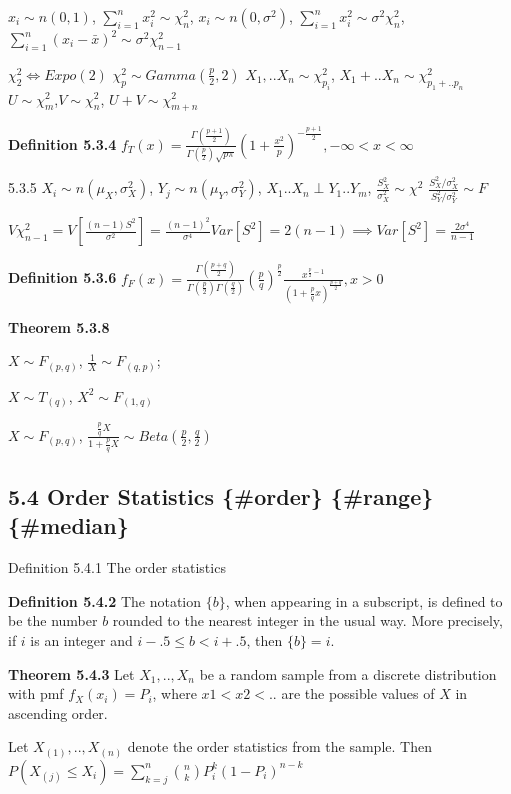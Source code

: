 \documentclass[10pt,twocolumn,portrait]{article}
\begin{document}
\(x_i\sim n(0,1)\), \(\sum_{i=1}^nx_i^2\sim \chi^2_n\),
\(x_i\sim n(0,\sigma^2)\), \(\sum_{i=1}^nx_i^2\sim \sigma^2\chi^2_n\),
\(\sum_{i=1}^n(x_i-\bar x)^2\sim \sigma^2\chi^2_{n-1}\)

\(\chi^2_{2}\Leftrightarrow Expo(2)\)
\(\chi^2_{p}\sim Gamma(\frac{p}2,2)\) \(X_1,..X_n\sim \chi^2_{p_i}\),
\(X_1+..X_n\sim \chi^2_{p_1+..p_n}\)
\(U\sim \chi^2_{m}\),\(V\sim \chi^2_{n}\), \(U+V\sim \chi^2_{m+n}\)

\textbf{Definition 5.3.4}
\(f_{T}(x)=\frac{\Gamma(\frac{p+1}2)}{\Gamma(\frac{p}2)\sqrt{p\pi}}\left (1+\frac{x^2}{p}\right)^{-\frac{p+1}2},-\infty<x<\infty\)

5.3.5 \(X_i\sim n(\mu_X,\sigma_X^2)\), \(Y_j\sim n(\mu_Y,\sigma_Y^2)\),
\(X_1..X_n\perp Y_1..Y_m\), \(\frac{S_X^2}{\sigma_X^2}\sim \chi^2\)
\(\frac{S_X^2/\sigma_X^2}{S_Y^2/\sigma_Y^2} \sim F\)

\(V\chi^2_{n-1}=V[\frac{(n-1)S^2}{\sigma^2}]=\frac{(n-1)^2}{\sigma^4}Var[S^2]=2(n-1)\implies Var[S^2]=\frac{2\sigma^4}{n-1}\)

\textbf{Definition 5.3.6}
\(f_{F}(x)=\frac{\Gamma(\frac{p+q}2)}{\Gamma(\frac{p}2)\Gamma (\frac{q}2)}(\frac{p}q)^{\frac{p}2}\frac{x^{\frac{p}2-1}}{(1+\frac{p}qx)^{\frac{p+q}2}}, x>0\)

\textbf{Theorem 5.3.8}

\(X\sim F_(p,q)\), \(\frac{1}X \sim F_(q,p)\);

\(X\sim T_(q)\), \(X^2 \sim F_(1,q)\)

\(X\sim F_(p,q)\),
\(\frac{\frac{p}{q}X}{1+\frac{p}{q}X} \sim Beta(\frac{p}2,\frac{q}2)\)

\hypertarget{perc}{%
\subsection{5.4 Order Statistics \{\#order\} \{\#range\}
\{\#median\}}\label{perc}}

Definition 5.4.1 The order statistics

\textbf{Definition 5.4.2} The notation \(\{b\}\), when appearing in a
subscript, is defined to be the number \(b\) rounded to the nearest
integer in the usual way. More precisely, if \(i\) is an integer and
\(i-.5\le b<i+.5\), then \(\{b\}=i\).

\textbf{Theorem 5.4.3} Let \(X_1,..,X_n\) be a random sample from a
discrete distribution with pmf \(f_X(x_i)=P_i\), where \(x1<x2<..\) are
the possible values of \(X\) in ascending order.

Let \(X_{(1)},..,X_{(n)}\) denote the order statistics from the sample.
Then \(P(X_{(j)}\le X_i)=\sum^n_{k=j}\binom{n}{k}P^k_i(1-P_i)^{n-k}\)
\end{document}
